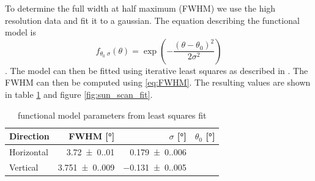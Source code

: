 To determine the full width at half maximum (FWHM) we use the high resolution data and fit it to a gaussian.
The equation describing the functional model is
\begin{equation}
    f_{\theta_0\;\sigma}(\theta) = \exp{\left(-\frac{(\theta-\theta_0)^2}{2\sigma^2}\right)}
\end{equation}.
The model can then be fitted using iterative least squares as described in \cite{adj_comp}. The FWHM can then be computed using \eqref{eq:FWHM}.
The resulting values are shown in table \ref{tab:params} and figure \ref{fig:sun_scan_fit}.
\begin{table}[H]
    \centering
    \begin{tabular}{lrrr}
        \toprule
        Direction & FWHM [\si{\degree}]& $ \sigma$ [\si{\degree}] & $ \theta_0 $ [\si{\degree}]\\
        \midrule
        Horizontal & \SI{3.72(0.01)}{} & \SI{0.179(0.006)}{}\\
        Vertical & \SI{3.751(0.009)}{} & \SI{-0.131(0.005)}{}\\
        \bottomrule
    \end{tabular}
    \caption{functional model parameters from least squares fit}
    \label{tab:params}
\end{table}
